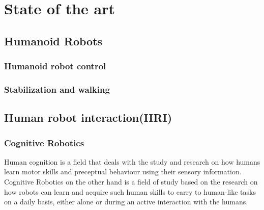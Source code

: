 
{\color{blue}\chapter{State of the art}\label{sota}}

\section{Humanoid Robots}
%	
%


\subsection{Humanoid robot control}

\subsection{Stabilization and walking}


\clearpage
\section{Human robot interaction(HRI)}

%
%
%	
%	

\subsection{Cognitive Robotics}
Human cognition is a field that deals with the study and research on how humans learn motor skills and preceptual behaviour using their sensory information. Cognitive Robotics on the other hand is a field of study based on the research on how robots can learn and acquire such human skills to carry to human-like tasks on a daily basis, either alone or during an active interaction with the humans.

